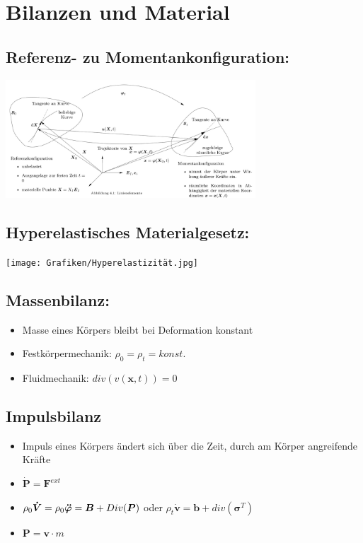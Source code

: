 \documentclass[fleqn,twoside]{article}
\begin{document}
\section{Bilanzen und Material}
\subsection{Referenz- zu Momentankonfiguration:}
        \includegraphics[width=0.7\textwidth]{Grafiken/Konfigurationsaenderung.jpg}
\subsection{Hyperelastisches Materialgesetz:}
        \texttt{[image: Grafiken/Hyperelastizität.jpg]}
\subsection{Massenbilanz:}
    \begin{itemize}
        \item Masse eines Körpers bleibt bei Deformation konstant
        \item Festkörpermechanik: $\rho_0 = \rho_t = konst.$
        \item Fluidmechanik: $div(v(\textbf{x},t))=0$
    \end{itemize} 
\subsection{Impulsbilanz} 
        \begin{itemize}
            \item Impuls eines Körpers ändert sich über die Zeit, durch am Körper angreifende Kräfte
            \item $\boldsymbol{\dot{P}}=\boldsymbol{F}^{ext}$
            \item $\rho_0 \boldsymbol{\dot{V}} = \rho_0 \boldsymbol{\Ddot{\varphi}} = \boldsymbol{B} + Div(\boldsymbol{P})$ oder $\rho_t \boldsymbol{\dot{v}} = \boldsymbol{b} + div\left(\boldsymbol{\sigma}^T\right)$
            \item $ \textbf{P} = \boldsymbol{v} \cdot m$
        \end{itemize}
\end{document}
